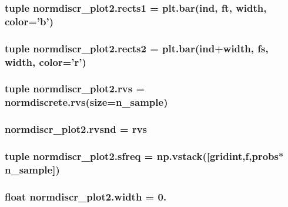 \subsubsection[{rects1}]{\setlength{\rightskip}{0pt plus 5cm}tuple normdiscr\+\_\+plot2.\+rects1 = {\bf plt.\+bar}({\bf ind}, {\bf ft}, {\bf width}, color='{\bf b}')}\label{namespacenormdiscr__plot2_ae6ee99a8c52300b90e4de7fc466ebfe9}
\hypertarget{namespacenormdiscr__plot2_ae0d990d06209b61e3d8b594d36937c72}{}
\subsubsection[{rects2}]{\setlength{\rightskip}{0pt plus 5cm}tuple normdiscr\+\_\+plot2.\+rects2 = {\bf plt.\+bar}({\bf ind}+{\bf width}, {\bf fs}, {\bf width}, color='{\bf r}')}\label{namespacenormdiscr__plot2_ae0d990d06209b61e3d8b594d36937c72}
\hypertarget{namespacenormdiscr__plot2_a1929219debd8806bf017653adc7fc911}{}
\subsubsection[{rvs}]{\setlength{\rightskip}{0pt plus 5cm}tuple normdiscr\+\_\+plot2.\+rvs = normdiscrete.\+rvs(size={\bf n\+\_\+sample})}\label{namespacenormdiscr__plot2_a1929219debd8806bf017653adc7fc911}
\hypertarget{namespacenormdiscr__plot2_a9138836ed78a0a4ce4046b410560ee6c}{}
\subsubsection[{rvsnd}]{\setlength{\rightskip}{0pt plus 5cm}normdiscr\+\_\+plot2.\+rvsnd = {\bf rvs}}\label{namespacenormdiscr__plot2_a9138836ed78a0a4ce4046b410560ee6c}
\hypertarget{namespacenormdiscr__plot2_a4888d25c27af56764826f51647db471a}{}
\subsubsection[{sfreq}]{\setlength{\rightskip}{0pt plus 5cm}tuple normdiscr\+\_\+plot2.\+sfreq = np.\+vstack(\mbox{[}{\bf gridint},f,{\bf probs}$\ast${\bf n\+\_\+sample}\mbox{]})}\label{namespacenormdiscr__plot2_a4888d25c27af56764826f51647db471a}
\hypertarget{namespacenormdiscr__plot2_a25df6e806f2a5936e42f0dbb45a6d0ab}{}
\subsubsection[{width}]{\setlength{\rightskip}{0pt plus 5cm}float normdiscr\+\_\+plot2.\+width = 0.}\label{namespacenormdiscr__plot2_a25df6e806f2a5936e42f0dbb45a6d0ab}

